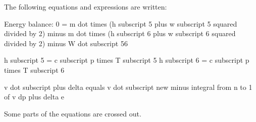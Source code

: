 The following equations and expressions are written:  

Energy balance:  
0 = m dot times (h subscript 5 plus w subscript 5 squared divided by 2) minus m dot times (h subscript 6 plus w subscript 6 squared divided by 2) minus W dot subscript 56  

h subscript 5 = c subscript p times T subscript 5  
h subscript 6 = c subscript p times T subscript 6  

v dot subscript plus delta equals v dot subscript new minus integral from n to 1 of v dp plus delta e  

Some parts of the equations are crossed out.